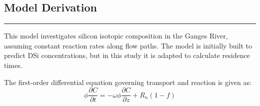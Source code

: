 \begin{tcolorbox}[
    colback=white,
    colframe=white,
    sharp corners,
    boxrule=0pt,
    breakable,
    width=\dimexpr\textwidth+1cm\relax,
    enlarge left by=-0.5cm,
    leftrule=0mm, rightrule=0mm, toprule=0mm, bottomrule=0mm
]




\subsection*{\textcite{fontorbeSiliconIsotopicComposition2013} Model Derivation}
\vspace{-5mm}
{\footnotesize

\noindent\rule{\textwidth}{0.5pt}

This model investigates silicon isotopic composition in the Ganges River, assuming constant reaction rates along flow paths. The model is initially built to predict DSi concentrations, but in this study it is adapted to calculate residence times.

\begin{multicols}{2}

    The first-order differential equation governing transport and reaction is given as:
    \vspace{10mm}
    \columnbreak
    \begin{equation}
    \phi \frac{\partial C}{\partial t} = -\omega \phi \frac{\partial C}{\partial z} + R_n(1-f)
    \end{equation} 
    
\end{multicols}

    
}
\end{tcolorbox}
